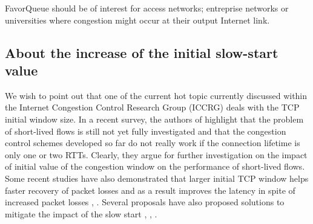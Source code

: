 \documentclass{elsart}
\begin{document}
FavorQueue should be of interest for access networks; entreprise networks or universities where congestion might occur at their output Internet link.  

\subsection{About the increase of the initial slow-start value}

We wish to point out that one of the current hot topic currently discussed within the Internet Congestion Control Research Group (ICCRG) deals with the TCP initial window size. 
In a recent survey, the authors of \cite{survey10cc} highlight that the problem of short-lived flows is still not yet fully investigated and that the congestion control schemes
developed so far do not really work if the connection lifetime is only one or two RTTs. Clearly, they argue for further investigation on the impact of initial value of the congestion window on the performance of short-lived flows.
Some recent studies have also demonstrated that larger initial TCP window helps faster recovery of packet losses and as a result improves the latency in spite of increased packet losses \cite{dukkipati10}, \cite{scharf09}. 
Several proposals have also proposed solutions to mitigate the impact of the slow start \cite{rfc4782}, \cite{jumpstart}, \cite{scharf08}. 
\end{document}
